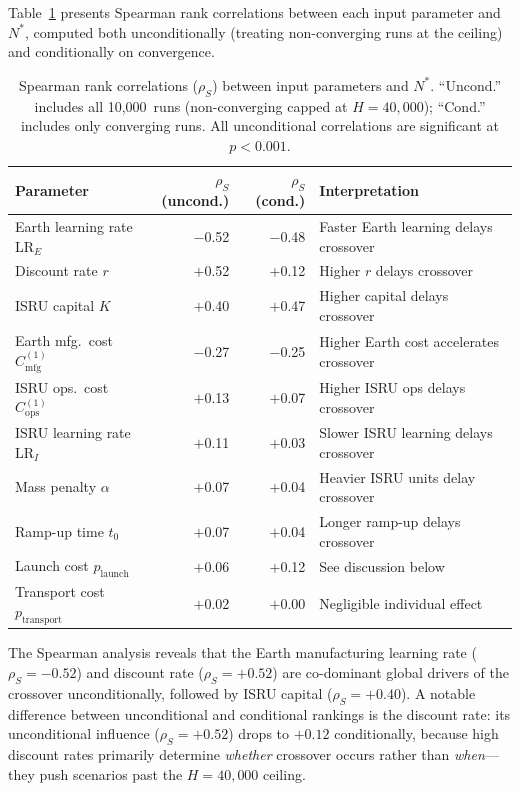\documentclass[preprint,12pt]{elsarticle}
\begin{document}
Table~\ref{tab:spearman} presents Spearman rank correlations between each input parameter and $N^*$, computed both unconditionally (treating non-converging runs at the ceiling) and conditionally on convergence.

\begin{table}[htbp]
\centering
\caption{Spearman rank correlations ($\rho_S$) between input parameters and $N^*$. ``Uncond.'' includes all 10{,}000~runs (non-converging capped at $H = 40{,}000$); ``Cond.'' includes only converging runs. All unconditional correlations are significant at $p < 0.001$.}
\label{tab:spearman}
\begin{tabular}{@{}lrrl@{}}
\toprule
Parameter & $\rho_S$ (uncond.) & $\rho_S$ (cond.) & Interpretation \\
\midrule
Earth learning rate LR$_E$     & $-$0.52 & $-$0.48 & Faster Earth learning delays crossover \\
Discount rate $r$              & $+$0.52 & $+$0.12 & Higher $r$ delays crossover \\
ISRU capital $K$               & $+$0.40 & $+$0.47 & Higher capital delays crossover \\
Earth mfg.\ cost $C_{\mathrm{mfg}}^{(1)}$ & $-$0.27 & $-$0.25 & Higher Earth cost accelerates crossover \\
ISRU ops.\ cost $C_{\mathrm{ops}}^{(1)}$ & $+$0.13 & $+$0.07 & Higher ISRU ops delays crossover \\
ISRU learning rate LR$_I$      & $+$0.11 & $+$0.03 & Slower ISRU learning delays crossover \\
Mass penalty $\alpha$          & $+$0.07 & $+$0.04 & Heavier ISRU units delay crossover \\
Ramp-up time $t_0$             & $+$0.07 & $+$0.04 & Longer ramp-up delays crossover \\
Launch cost $p_{\mathrm{launch}}$   & $+$0.06 & $+$0.12 & See discussion below \\
Transport cost $p_{\mathrm{transport}}$ & $+$0.02 & $+$0.00 & Negligible individual effect \\
\bottomrule
\end{tabular}
\end{table}

The Spearman analysis reveals that the Earth manufacturing learning rate ($\rho_S = -0.52$) and discount rate ($\rho_S = +0.52$) are co-dominant global drivers of the crossover unconditionally, followed by ISRU capital ($\rho_S = +0.40$). A notable difference between unconditional and conditional rankings is the discount rate: its unconditional influence ($\rho_S = +0.52$) drops to $+0.12$ conditionally, because high discount rates primarily determine \emph{whether} crossover occurs rather than \emph{when}---they push scenarios past the $H = 40{,}000$ ceiling.
\end{document}
